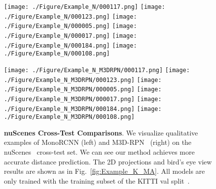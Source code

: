 \documentclass[10pt,twocolumn,letterpaper]{article}
\begin{document}
\begin{figure*}
\begin{minipage}{0.5\linewidth}
\centering
\texttt{[image: ./Figure/Example\_N/000117.png]}
\texttt{[image: ./Figure/Example\_N/000123.png]}
\texttt{[image: ./Figure/Example\_N/000005.png]}
\texttt{[image: ./Figure/Example\_N/000017.png]}
\texttt{[image: ./Figure/Example\_N/000184.png]}
\texttt{[image: ./Figure/Example\_N/000108.png]}
\end{minipage}
\begin{minipage}{0.5\linewidth} 
\centering
\texttt{[image: ./Figure/Example\_N\_M3DRPN/000117.png]}
\texttt{[image: ./Figure/Example\_N\_M3DRPN/000123.png]}
\texttt{[image: ./Figure/Example\_N\_M3DRPN/000005.png]}
\texttt{[image: ./Figure/Example\_N\_M3DRPN/000017.png]}
\texttt{[image: ./Figure/Example\_N\_M3DRPN/000184.png]}
\texttt{[image: ./Figure/Example\_N\_M3DRPN/000108.png]}
\end{minipage}
\caption{\textbf{nuScenes Cross-Test Comparisons}. We visualize qualitative examples of MonoRCNN (left) and M3D-RPN~\cite{DBLP:conf/iccv/Brazil019} (right) on the nuScenes~\cite{DBLP:conf/cvpr/CaesarBLVLXKPBB20} cross-test set. We can see our method achieves more accurate distance prediction. The 2D projections and bird's eye view results are shown as in Fig.~\ref{fig:Example_K_MA}. All models are only trained with the training subset of the KITTI val split~\cite{DBLP:conf/nips/ChenKZBMFU15}.}
\label{fig:Example_N_MA}
\end{figure*} 
\end{document}

